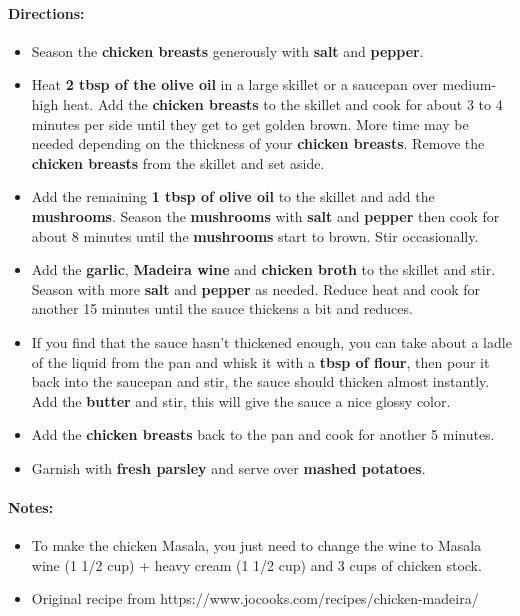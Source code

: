 \documentclass{article}
\begin{document}
\paragraph{Directions:}
\begin{itemize}
    \item Season the \textbf{chicken breasts} generously with \textbf{salt} and \textbf{pepper}.
    \item Heat \textbf{2 tbsp of the olive oil} in a large skillet or a saucepan over medium-high heat. Add the \textbf{chicken breasts} to the skillet and cook for about 3 to 4 minutes per side until they get to get golden brown. More time may be needed depending on the thickness of your \textbf{chicken breasts}. Remove the \textbf{chicken breasts} from the skillet and set aside.
    \item Add the remaining \textbf{1 tbsp of olive oil} to the skillet and add the \textbf{mushrooms}. Season the \textbf{mushrooms} with \textbf{salt} and \textbf{pepper} then cook for about 8 minutes until the \textbf{mushrooms} start to brown. Stir occasionally.
    \item Add the \textbf{garlic}, \textbf{Madeira wine} and \textbf{chicken broth} to the skillet and stir. Season with more \textbf{salt} and \textbf{pepper} as needed. Reduce heat and cook for another 15 minutes until the sauce thickens a bit and reduces.
    \item If you find that the sauce hasn’t thickened enough, you can take about a ladle of the liquid from the pan and whisk it with a \textbf{tbsp of flour}, then pour it back into the saucepan and stir, the sauce should thicken almost instantly. Add the \textbf{butter} and stir, this will give the sauce a nice glossy color.
    \item Add the \textbf{chicken breasts} back to the pan and cook for another 5 minutes.
    \item Garnish with \textbf{fresh parsley} and serve over \textbf{mashed potatoes}.
\end{itemize}

\paragraph{Notes:}
\begin{itemize}
    \item To make the chicken Masala, you just need to change the wine to Masala wine (1 1/2 cup) + heavy cream (1 1/2 cup) and 3 cups of chicken stock.
    \item Original recipe from https://www.jocooks.com/recipes/chicken-madeira/
\end{itemize}
\end{document}
